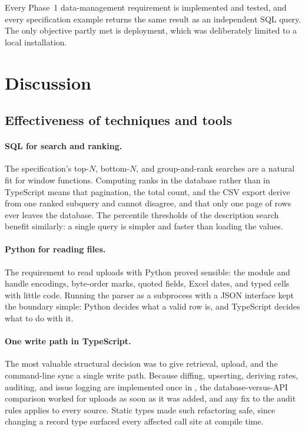 \documentclass[11pt,a4paper]{article}
\begin{document}
Every Phase~1 data-management requirement is implemented and tested, and every specification
example returns the same result as an independent SQL query. The only objective partly met is
deployment, which was deliberately limited to a local installation.

\section{Discussion}
\label{sec:discussion}

\subsection{Effectiveness of techniques and tools}

\paragraph{SQL for search and ranking.} The specification's top-$N$, bottom-$N$, and
group-and-rank searches are a natural fit for window functions. Computing ranks in the
database rather than in TypeScript means that pagination, the total count, and the CSV export
derive from one ranked subquery and cannot disagree, and that only one page of rows ever leaves
the database. The percentile thresholds of the description search benefit similarly: a single
 query is simpler and faster than loading the values.

\paragraph{Python for reading files.} The requirement to read uploads with Python proved
sensible: the  module and  handle encodings, byte-order marks, quoted
fields, Excel dates, and typed cells with little code. Running the parser as a subprocess with a
JSON interface kept the boundary simple: Python decides what a valid row is, and TypeScript
decides what to do with it.

\paragraph{One write path in TypeScript.} The most valuable structural decision was to give
retrieval, upload, and the command-line sync a single write path. Because diffing, upserting,
deriving rates, auditing, and issue logging are implemented once in , the
database-versus-API comparison worked for uploads as soon as it was added, and any fix to the
audit rules applies to every source. Static types made such refactoring safe, since changing a
record type surfaced every affected call site at compile time.
\end{document}
